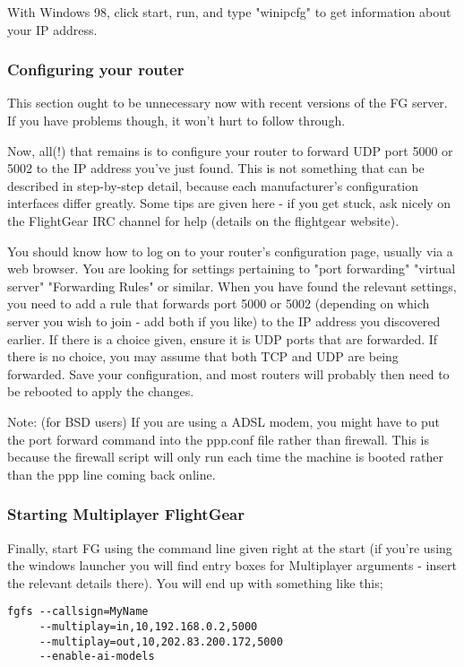 With Windows 98, click start, run, and type "winipcfg" to get information about your IP address.

\subsubsection{Configuring your router}

This section ought to be unnecessary now with recent versions of the FG server.  If you have problems though, 
it won't hurt to follow through.

Now, all(!) that remains is to configure your router to forward UDP port 5000 or 5002 to the IP address you've just found. 
This is not something that can be described in step-by-step detail, because each manufacturer's configuration interfaces 
differ greatly. Some tips are given here - if you get stuck, ask nicely on the FlightGear IRC channel for help (details 
on the flightgear website).

You should know how to log on to your router's configuration page, usually via a web browser. You are looking for settings 
pertaining to "port forwarding" "virtual server" "Forwarding Rules" or similar. When you have found the relevant settings, 
you need to add a rule that forwards port 5000 or 5002 (depending on which server you wish to join - add both if you like) 
to the IP address you discovered earlier. If there is a choice given, ensure it is UDP ports that are forwarded. If there 
is no choice, you may assume that both TCP and UDP are being forwarded. Save your configuration, and most routers will 
probably then need to be rebooted to apply the changes.

Note: (for BSD users) If you are using a ADSL modem, you might have to put the port forward command into the ppp.conf 
file rather than firewall. This is because the firewall script will only run each time the machine is booted rather 
than the ppp line coming back online.

\subsubsection{Starting Multiplayer FlightGear}

Finally, start FG using the command line given right at the start (if you're using the windows launcher you will 
find entry boxes for Multiplayer arguments - insert the relevant details there). You will end up with something like this;

\begin{verbatim}
fgfs --callsign=MyName 
     --multiplay=in,10,192.168.0.2,5000   
     --multiplay=out,10,202.83.200.172,5000 
     --enable-ai-models
\end{verbatim}

